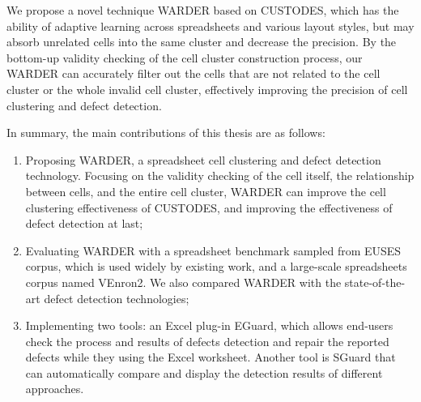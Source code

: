 \begin{englishabstract}
We propose a novel technique WARDER based on CUSTODES, which has the ability of adaptive learning across spreadsheets and various layout styles, 
but may absorb unrelated cells into the same cluster and decrease the precision. 
By the bottom-up validity checking of the cell cluster construction process, 
our WARDER can accurately filter out the cells that are not related to the cell cluster or the whole invalid cell cluster, 
effectively improving the precision of cell clustering and defect detection.


In summary, the main contributions of this thesis are as follows:
\begin{enumerate}
    \item Proposing WARDER, a spreadsheet cell clustering and defect detection technology. Focusing on the validity checking of the cell itself, the relationship between cells, and the entire cell cluster, WARDER can improve the cell clustering effectiveness of CUSTODES, and improving the effectiveness of defect detection at last;
    
    \item Evaluating WARDER with a spreadsheet benchmark sampled from EUSES corpus, which is used widely by existing work, and a large-scale spreadsheets corpus named VEnron2. We also compared WARDER with the state-of-the-art defect detection technologies;
    
    \item Implementing two tools: an Excel plug-in EGuard, which allows end-users check the process and results of defects detection and repair the reported defects while they using the Excel worksheet. Another tool is SGuard that can automatically compare and display the detection results of different approaches.
    
    

\end{enumerate}
\end{englishabstract}
